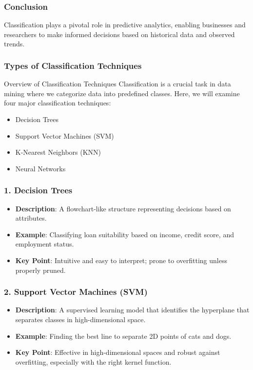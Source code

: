 \documentclass{beamer}
\begin{document}
\begin{frame}[fragile]
    \frametitle{Conclusion}
    Classification plays a pivotal role in predictive analytics, enabling businesses 
    and researchers to make informed decisions based on historical data and observed 
    trends.
\end{frame}

\begin{frame}[fragile]
    \frametitle{Types of Classification Techniques}
    \begin{block}{Overview of Classification Techniques}
        Classification is a crucial task in data mining where we categorize data into predefined classes.
        Here, we will examine four major classification techniques: 
        \begin{itemize}
            \item Decision Trees
            \item Support Vector Machines (SVM)
            \item K-Nearest Neighbors (KNN)
            \item Neural Networks
        \end{itemize}
    \end{block}
\end{frame}

\begin{frame}[fragile]
    \frametitle{1. Decision Trees}
    \begin{itemize}
        \item \textbf{Description}: A flowchart-like structure representing decisions based on attributes.
        \item \textbf{Example}: Classifying loan suitability based on income, credit score, and employment status.
        \item \textbf{Key Point}: Intuitive and easy to interpret; prone to overfitting unless properly pruned.
    \end{itemize}
\end{frame}

\begin{frame}[fragile]
    \frametitle{2. Support Vector Machines (SVM)}
    \begin{itemize}
        \item \textbf{Description}: A supervised learning model that identifies the hyperplane that separates classes in high-dimensional space.
        \item \textbf{Example}: Finding the best line to separate 2D points of cats and dogs.
        \item \textbf{Key Point}: Effective in high-dimensional spaces and robust against overfitting, especially with the right kernel function.
    \end{itemize}
\end{frame}
\end{document}
